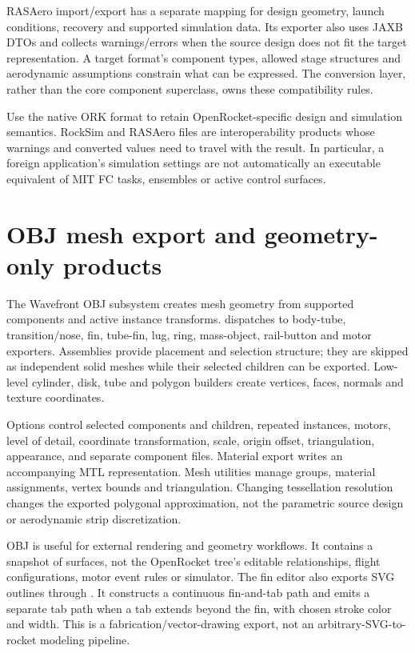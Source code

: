 RASAero import/export has a separate mapping for design geometry, launch conditions, recovery and supported simulation data. Its exporter also uses JAXB DTOs and collects warnings/errors when the source design does not fit the target representation. A target format's component types, allowed stage structures and aerodynamic assumptions constrain what can be expressed. The conversion layer, rather than the core component superclass, owns these compatibility rules.

Use the native ORK format to retain OpenRocket-specific design and simulation semantics. RockSim and RASAero files are interoperability products whose warnings and converted values need to travel with the result. In particular, a foreign application's simulation settings are not automatically an executable equivalent of MIT FC tasks, ensembles or active control surfaces.


\section{OBJ mesh export and geometry-only products}
The Wavefront OBJ subsystem creates mesh geometry from supported components and active instance transforms.  dispatches to body-tube, transition/nose, fin, tube-fin, lug, ring, mass-object, rail-button and motor exporters. Assemblies provide placement and selection structure; they are skipped as independent solid meshes while their selected children can be exported. Low-level cylinder, disk, tube and polygon builders create vertices, faces, normals and texture coordinates.

Options control selected components and children, repeated instances, motors, level of detail, coordinate transformation, scale, origin offset, triangulation, appearance, and separate component files. Material export writes an accompanying MTL representation. Mesh utilities manage groups, material assignments, vertex bounds and triangulation. Changing tessellation resolution changes the exported polygonal approximation, not the parametric source design or aerodynamic strip discretization.

OBJ is useful for external rendering and geometry workflows. It contains a snapshot of surfaces, not the OpenRocket tree's editable relationships, flight configurations, motor event rules or simulator. The fin editor also exports SVG outlines through . It constructs a continuous fin-and-tab path and emits a separate tab path when a tab extends beyond the fin, with chosen stroke color and width. This is a fabrication/vector-drawing export, not an arbitrary-SVG-to-rocket modeling pipeline.

